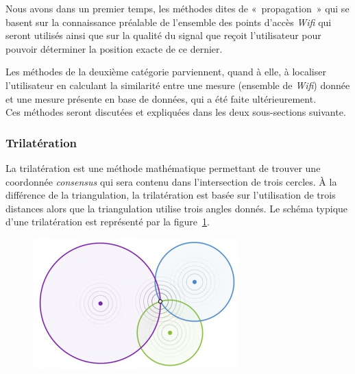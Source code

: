 \documentclass[10pt,journal,compsoc]{IEEEtran}
\begin{document}
    Nous avons dans un premier temps, les méthodes dites de «~propagation~» qui se basent sur la connaissance préalable de l'ensemble des points d'accès
	\textit{Wifi} qui seront utilisés ainsi que sur la qualité du signal que reçoit l'utilisateur pour pouvoir déterminer la position exacte de ce dernier.

    Les méthodes de la deuxième catégorie parviennent, quand à elle, à localiser l'utilisateur en calculant la similarité entre une mesure (ensemble de
	\textit{Wifi}) donnée et une mesure présente en base de données, qui a été faite ultérieurement.\\  %
    Ces méthodes seront discutées et expliquées dans les deux sous-sections suivante.

    \subsubsection{Trilatération}
      La trilatération est une méthode mathématique permettant de trouver une coordonnée \textit{consensus} qui sera contenu %
	  dans l'intersection de trois
	  cercles. À la différence de la triangulation, la trilatération est basée sur l'utilisation de trois distances alors que la triangulation utilise
	  trois angles donnés. Le schéma typique d'une trilatération est représenté par la figure~\ref{fig:trilatération}.

	  \begin{figure}
	  	\label{fig:trilatération}
        \includegraphics[scale=0.8]{images/trilateration.png}
      \end{figure}
\end{document}
